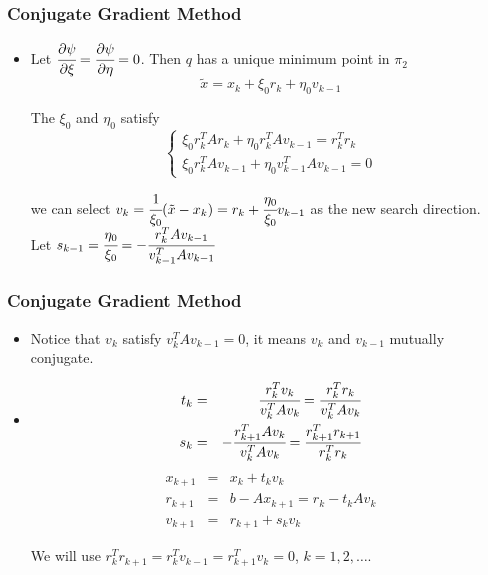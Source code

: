 \documentclass[notheorems,mathserif,table,compress]{beamer}  %
\begin{document}
%
\begin{frame}
\frametitle{Conjugate Gradient Method} 
\begin{itemize}
\item Let $\cfrac{\partial\psi}{\partial\xi}=\cfrac{\partial\psi}{\partial \eta}=0$. Then $q$ has a unique minimum point in $\pi_2$
\begin{displaymath}
\tilde{x}=x_k+\xi_0 r_k+\eta_0 v_{k-1}
\end{displaymath} 

The $\xi_0$ and $\eta_0$ satisfy
\begin{displaymath}
\left\{\begin{array}{ll}
\xi_0r_k^TAr_k+\eta_0 r_k^TAv_{k-1}=r_k^Tr_k\\
\xi_0r_k^TAv_{k-1}+\eta_0 v_{k-1}^TAv_{k-1}=0 \end{array} \right.
\end{displaymath}

we can select $v_k=\cfrac{1}{\xi_0}(\tilde{x}-x_k)=r_k+\cfrac{\eta_0}{\xi_0}v_{k-1}$ as the new search direction.\\
Let $s_{k-1}=\cfrac{\eta_0}{\xi_0}=-\cfrac{r_k^TAv_{k-1}}{v_{k-1}^TAv_{k-1}}$
\end{itemize}
\end{frame}

%
\begin{frame}
\frametitle{Conjugate Gradient Method} 
\begin{itemize}
\item Notice that $v_k$ satisfy $v_k^TAv_{k-1}=0$, it means $v_k$ and $v_{k-1}$ mutually conjugate.
\item 
\begin{eqnarray*}
t_k&=&\cfrac{r_k^Tv_k}{v_k^TAv_k}=\cfrac{r_k^Tr_k}{v_k^TAv_k}\\
s_k&=&-\cfrac{r_{k+1}^TAv_k}{v_k^TAv_k}=\cfrac{r_{k+1}^Tr_{k+1}}{r_k^Tr_k}
\end{eqnarray*}
\begin{eqnarray*}
x_{k+1}&=&x_k+t_kv_k\\
r_{k+1}&=&b-Ax_{k+1}=r_k-t_kAv_k\\
v_{k+1}&=&r_{k+1}+s_kv_k
\end{eqnarray*}

We will use $r_k^Tr_{k+1}=r_k^Tv_{k-1}=r_{k+1}^Tv_k=0$, $k=1,2,\ldots$.
\end{itemize}
\end{frame}
\end{document}
